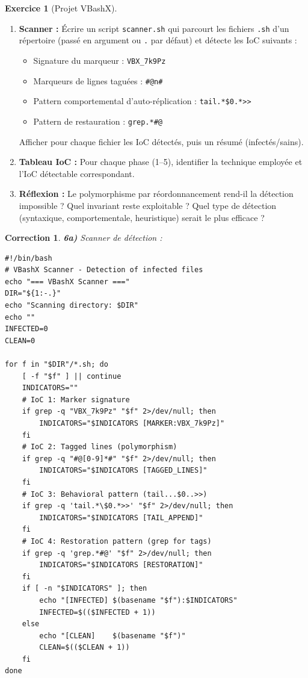 \documentclass[a4paper,11pt]{article}
\theoremstyle{plain}
\newtheorem{correction}{Correction}
\theoremstyle{definition}
\newtheorem{exercice}{Exercice}
\begin{document}
\begin{exercice}[Projet VBashX]
\begin{enumerate}
\item[\textbf{6a)}] \textbf{Scanner :} Écrire un script \texttt{scanner.sh} qui parcourt les fichiers \texttt{.sh} d'un répertoire (passé en argument ou \texttt{.} par défaut) et détecte les IoC suivants :
\begin{itemize}
    \item Signature du marqueur : \texttt{VBX\_7k9Pz}
    \item Marqueurs de lignes taguées : \texttt{\#@n\#}
    \item Pattern comportemental d'auto-réplication : \texttt{tail.*\$0.*>>}
    \item Pattern de restauration : \texttt{grep.*\#@}
\end{itemize}
Afficher pour chaque fichier les IoC détectés, puis un résumé (infectés/sains).

\item[\textbf{6b)}] \textbf{Tableau IoC :} Pour chaque phase (1--5), identifier la technique employée et l'IoC détectable correspondant.

\item[\textbf{6c)}] \textbf{Réflexion :} Le polymorphisme par réordonnancement rend-il la détection impossible ? Quel invariant reste exploitable ? Quel type de détection (syntaxique, comportementale, heuristique) serait le plus efficace ?
\end{enumerate}

\begin{correction}

\textbf{6a)} Scanner de détection :
\begin{lstlisting}[title=scanner.sh]
#!/bin/bash
# VBashX Scanner - Detection of infected files
echo "=== VBashX Scanner ==="
DIR="${1:-.}"
echo "Scanning directory: $DIR"
echo ""
INFECTED=0
CLEAN=0

for f in "$DIR"/*.sh; do
    [ -f "$f" ] || continue
    INDICATORS=""
    # IoC 1: Marker signature
    if grep -q "VBX_7k9Pz" "$f" 2>/dev/null; then
        INDICATORS="$INDICATORS [MARKER:VBX_7k9Pz]"
    fi
    # IoC 2: Tagged lines (polymorphism)
    if grep -q "#@[0-9]*#" "$f" 2>/dev/null; then
        INDICATORS="$INDICATORS [TAGGED_LINES]"
    fi
    # IoC 3: Behavioral pattern (tail...$0..>>)
    if grep -q 'tail.*\$0.*>>' "$f" 2>/dev/null; then
        INDICATORS="$INDICATORS [TAIL_APPEND]"
    fi
    # IoC 4: Restoration pattern (grep for tags)
    if grep -q 'grep.*#@' "$f" 2>/dev/null; then
        INDICATORS="$INDICATORS [RESTORATION]"
    fi
    if [ -n "$INDICATORS" ]; then
        echo "[INFECTED] $(basename "$f"):$INDICATORS"
        INFECTED=$(($INFECTED + 1))
    else
        echo "[CLEAN]    $(basename "$f")"
        CLEAN=$(($CLEAN + 1))
    fi
done


\end{lstlisting}
\end{correction}
\end{exercice}
\end{document}
